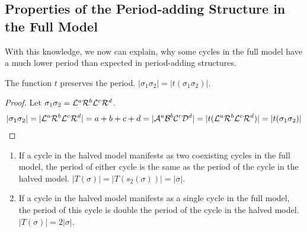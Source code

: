 \subsection{Properties of the Period-adding Structure in the Full Model}

With this knowledge, we now can explain, why some cycles in the full model have a much lower period than expected in period-adding structures.

\begin{lemma}
    \label{lemma:t.preserves.period}
    The function $t$ preserves the period. $|\sigma_1\sigma_2| = |t(\sigma_1\sigma_2)|$.
\end{lemma}

\begin{proof}
    Let $\sigma_1\sigma_2 = \mathcal{L}^a\mathcal{R}^b\mathcal{L}^c\mathcal{R}^d$.
    \begin{align*}
        |\sigma_1\sigma_2| =  |\mathcal{L}^a\mathcal{R}^b\mathcal{L}^c\mathcal{R}^d|
        = a + b + c + d
        = |\mathcal{A}^a\mathcal{B}^b\mathcal{C}^c\mathcal{D}^d|
        = |t(\mathcal{L}^a\mathcal{R}^b\mathcal{L}^c\mathcal{R}^d)|
        = |t(\sigma_1\sigma_2)|
    \end{align*}
\end{proof}

\begin{theorem}
    \begin{enumerate}
        \item If a cycle in the halved model manifests as two coexisting cycles in the full model, the period of either cycle is the same as the period of the cycle in the halved model. $|T(\sigma)| = |T(s_2(\sigma))| = |\sigma|$.
        \item If a cycle in the halved model manifests as a single cycle in the full model, the period of this cycle is double the period of the cycle in the halved model. $|T(\sigma)| = 2 |\sigma|$.
    \end{enumerate}
\end{theorem}

